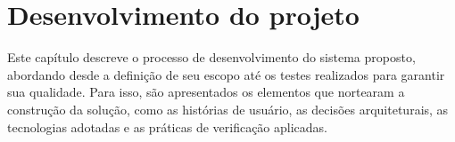 	\chapter{Desenvolvimento do projeto}

	Este capítulo descreve o processo de desenvolvimento do sistema proposto, abordando desde a definição de seu escopo até os testes realizados para garantir sua qualidade. Para isso, são apresentados os elementos que nortearam a construção da solução, como as histórias de usuário, as decisões arquiteturais, as tecnologias adotadas e as práticas de verificação aplicadas.
	
	
	
	
	
	
	
	
	
	
